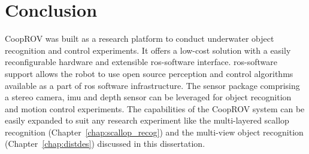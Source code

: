\section{Conclusion}

CoopROV was built as a research platform to conduct underwater object recognition and control experiments. It offers a low-cost solution with a easily reconfigurable hardware and extensible \gls{ros}-software interface. \gls{ros}-software support allows the robot to use open source perception and control algorithms available as a part of \gls{ros} software infrastructure. The sensor package comprising a stereo camera, \gls{imu} and depth sensor can be leveraged for object recognition and motion control experiments. The capabilities of the CoopROV system can be easily expanded to suit any research experiment like the multi-layered scallop recognition (Chapter~\ref{chap:scallop_recog}) and the multi-view object recognition (Chapter~\ref{chap:distdes}) discussed in this dissertation.
